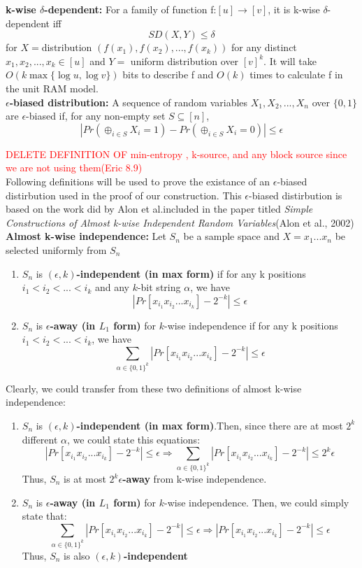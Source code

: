 \documentclass[letterpaper]{article} %
\begin{document}
	\noindent\textbf{k-wise $\delta$-dependent:}
	For a family of function f:$[u]\rightarrow[v]$, it is k-wise $\delta$-dependent iff
$$SD(X,Y)\le \delta$$
for $X=$distribution $(f(x_1),f(x_2),...,f(x_k))$ for any distinct $x_1,x_2,...,x_k\in[u]$ and $Y=$ uniform distribution over $[v]^k$.
	It will take $O(k\max\{\log u, \log v\})$ bits to describe f and $O(k)$ times to calculate f in the unit RAM model.\\

	\noindent\textbf{$\epsilon$-biased distribution:}
	A sequence of random variables $X_1,X_2,...,X_n$ over $\{0,1\}$ are $\epsilon$-biased if, for any non-empty set $S\subseteq [n]$,
	$$|Pr(\oplus_{i\in S} X_i = 1)-Pr(\oplus_{i\in S} X_i = 0)|\le \epsilon$$
	
	\textcolor{red}{DELETE DEFINITION OF min-entropy , k-source, and any block source since we are not using them(Eric 8.9)}\\
	Following definitions will be used to prove the existance of an $\epsilon$-biased distirbution used in the proof of our construction. This $\epsilon$-biased distirbution is based on the work did by Alon et al.included in the paper titled \textit{Simple Constructions of Almost k-wise Independent Random Variables}(Alon et al., 2002)\\

	\noindent\textbf{Almost k-wise independence:}
	Let $S_n$ be a sample space and $X=x_1...x_n$ be selected uniformly from $S_n$
	\begin{enumerate}
	\item $S_n$ is  \textbf{$(\epsilon,k)$-independent (in max form)} if for any k positions $i_1<i_2<...<i_k$ and any $k$-bit string $\alpha$, we have
		$$|Pr[x_{i_1}x_{i_2}...x_{i_k}]-2^{-k}|\le \epsilon$$
	\item $S_n$ is \textbf{$\epsilon$-away (in $L_1$ form)} for $k$-wise independence if for any k positions $i_1<i_2<...<i_k$, we have
		$$\sum_{\alpha\in\{0,1\}^k}|Pr[x_{i_1}x_{i_2}...x_{i_k}]-2^{-k}| \le \epsilon$$
	\end{enumerate}
	Clearly, we could transfer from these two definitions of almost k-wise independence:
	\begin{enumerate}
	\item $S_n$ is  \textbf{$(\epsilon,k)$-independent (in max form)}.Then, since there are at most $2^k$ different $\alpha$, we could state this equations:
$$|Pr[x_{i_1}x_{i_2}...x_{i_k}]-2^{-k}|\le \epsilon \Rightarrow \sum_{\alpha\in\{0,1\}^k}|Pr[x_{i_1}x_{i_2}...x_{i_k}]-2^{-k}| \le 2^k\epsilon$$
	Thus, $S_n$ is at most \textbf{$2^k\epsilon$-away} from k-wise independence.
	\item $S_n$ is \textbf{$\epsilon$-away (in $L_1$ form)} for $k$-wise independence. Then, we could simply state that:
$$\sum_{\alpha\in\{0,1\}^k}|Pr[x_{i_1}x_{i_2}...x_{i_k}]-2^{-k}| \le \epsilon \Rightarrow |Pr[x_{i_1}x_{i_2}...x_{i_k}]-2^{-k}|\le \epsilon $$
	Thus, $S_n$ is also \textbf{$(\epsilon,k)$-independent}
	\end{enumerate}
		
\end{document}
